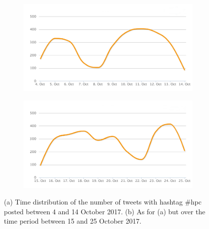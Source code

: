\begin{figure}
 \centering
 \begin{subfigure}[b]{0.95\textwidth}
   \includegraphics[width=1\linewidth]{Images/FirstSearch_HPC.png}
   \caption{} 
 \end{subfigure}

 \begin{subfigure}[b]{0.95\textwidth}
   \includegraphics[width=1\linewidth]{Images/SecondSearch_HPC.png}
   \caption{}
 \end{subfigure}
 \caption{(a) Time distribution of the number of tweets with hashtag \#hpc posted between 4 and 14 October 2017. (b) As for (a) but over the time period between 15 and 25 October 2017.} 
 \label{First-SecondSearch_HPC}
\end{figure}

